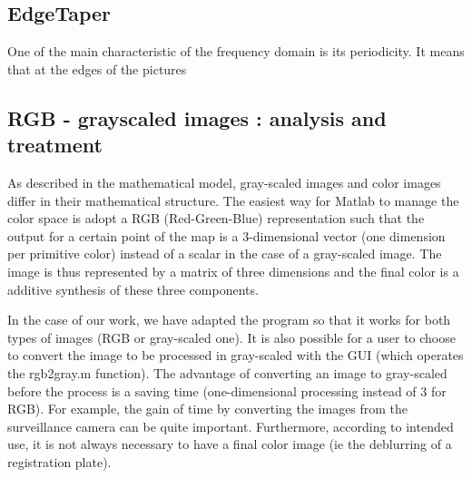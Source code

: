 \subsection{EdgeTaper}

One of the main characteristic of the frequency domain is its periodicity. It means that at the edges of the pictures  

\subsection{RGB - grayscaled images : analysis and treatment}

As described in the mathematical model, gray-scaled images and color images differ in their mathematical structure. The easiest way for Matlab to manage the color space is adopt a RGB (Red-Green-Blue) representation such that the output for a certain point of the map is a 3-dimensional vector (one dimension per primitive color) instead of a scalar in the case of a gray-scaled image. The image is thus represented by a matrix of three dimensions and the final color is a additive synthesis of these three components.
 
In the case of our work, we have adapted the program so that it works for both types of images (RGB or gray-scaled one). It is also possible for a user to choose to convert the image to be processed in gray-scaled with the GUI (which operates the rgb2gray.m function). The advantage of converting an image to gray-scaled before the process is a saving time (one-dimensional processing instead of 3 for RGB). For example, the gain of time by converting the images from the surveillance camera can be quite important. Furthermore, according to intended use, it is not always necessary to have a final color image (ie the deblurring of a registration plate).
